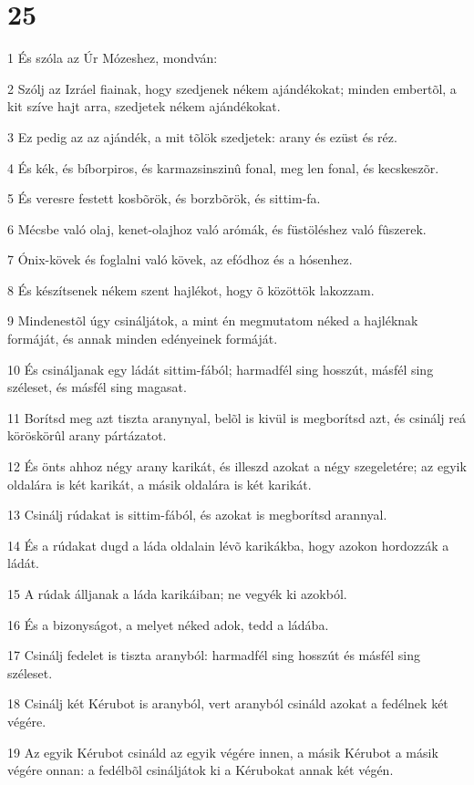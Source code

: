 \chapter{25}

\par 1 És szóla az Úr Mózeshez, mondván:
\par 2 Szólj az Izráel fiainak, hogy szedjenek nékem ajándékokat; minden embertõl, a kit szíve hajt arra, szedjetek nékem ajándékokat.
\par 3 Ez pedig az az ajándék, a mit tõlök szedjetek: arany és ezüst és réz.
\par 4 És kék, és bíborpiros, és karmazsinszinû fonal, meg len fonal, és kecskeszõr.
\par 5 És veresre festett kosbõrök, és borzbõrök, és sittim-fa.
\par 6 Mécsbe való olaj, kenet-olajhoz való arómák, és füstöléshez való fûszerek.
\par 7 Ónix-kövek és foglalni való kövek, az efódhoz és a hósenhez.
\par 8 És készítsenek nékem szent hajlékot, hogy õ közöttök lakozzam.
\par 9 Mindenestõl úgy csináljátok, a mint én megmutatom néked a hajléknak formáját, és annak minden edényeinek formáját.
\par 10 És csináljanak egy ládát sittim-fából; harmadfél sing hosszút, másfél sing széleset, és másfél sing magasat.
\par 11 Borítsd meg azt tiszta aranynyal, belõl is kivül is megborítsd azt, és csinálj reá köröskörûl arany pártázatot.
\par 12 És önts ahhoz négy arany karikát, és illeszd azokat a négy szegeletére; az egyik oldalára is két karikát, a másik oldalára is két karikát.
\par 13 Csinálj rúdakat is sittim-fából, és azokat is megborítsd arannyal.
\par 14 És a rúdakat dugd a láda oldalain lévõ karikákba, hogy azokon hordozzák a ládát.
\par 15 A rúdak álljanak a láda karikáiban; ne vegyék ki azokból.
\par 16 És a bizonyságot, a melyet néked adok, tedd a ládába.
\par 17 Csinálj fedelet is tiszta aranyból: harmadfél sing hosszút és másfél sing széleset.
\par 18 Csinálj két Kérubot is aranyból, vert aranyból csináld azokat a fedélnek két végére.
\par 19 Az egyik Kérubot csináld az egyik végére innen, a másik Kérubot a másik végére onnan: a fedélbõl csináljátok ki a Kérubokat annak két végén.
